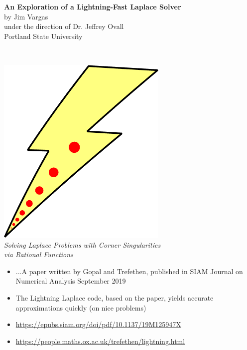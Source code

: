 \documentclass{seminar}
\begin{document}
 
\pagestyle{headings}
\centerslidesfalse

\begin{slide} %
\vspace*{\fill}
\begin{center}
{\large\bf\color{Green} An Exploration of a Lightning-Fast Laplace Solver}\\
by Jim Vargas\\
under the direction of Dr. Jeffrey Ovall\\
Portland State University\\
\end{center}
\vspace*{\fill}
\end{slide} %




\begin{slide} %
{} \small \\

\begin{center}
	\includegraphics[scale=0.2]{./PNG/llogo}\\
	\large{\emph{Solving Laplace Problems with Corner Singularities\\ via Rational Functions}}
\end{center}

\begin{itemize}
	\item ...A paper written by Gopal and Trefethen, published in SIAM Journal on Numerical Analysis September 2019
	\item The Lightning Laplace code, based on the paper, yields accurate approximations quickly (on nice problems)
	\item \url{https://epubs.siam.org/doi/pdf/10.1137/19M125947X}
	\item \url{https://people.maths.ox.ac.uk/trefethen/lightning.html}
\end{itemize}
\end{slide} %
\end{document}
